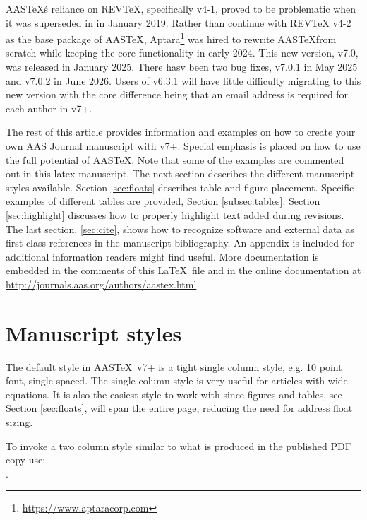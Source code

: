 \documentclass[linenumbers,amsmath,trackchanges]{aastex702}
\newcommand\aastex{AAS\TeX}
\newcommand\latex{La\TeX}
\begin{document}
\aastex\'s reliance on REVTeX, specifically v4-1, proved to be problematic when it was superseded in in January 2019. Rather than continue with REVTeX v4-2 as the base package of \aastex, Aptara\footnote{\url{https://www.aptaracorp.com}} was hired to rewrite \aastex from scratch while keeping the core functionality in early 2024. This new version, v7.0, was released in January 2025. There hasv been two bug fixes, v7.0.1 in May 2025 and v7.0.2 in June 2026. Users of v6.3.1 will have little difficulty migrating to this new version with the core difference being that an email address is required for each author in v7+.

The rest of this article provides information and examples on how to create
your own AAS Journal manuscript with v7+.  Special emphasis is placed on
how to use the full potential of \aastex. Note that some of the examples are commented out in this latex manuscript. The next section describes
the different manuscript styles available.
Section \ref{sec:floats} describes table and figure placement. 
Specific examples of different tables are provided,  Section
\ref{subsec:tables}.
Section \ref{sec:highlight}
discusses how to properly highlight text added during revisions.  
The last section,
\ref{sec:cite}, shows how to recognize software and external data as first
class references in the manuscript bibliography.  An appendix is included
for additional information readers might find useful.
More documentation is embedded in the comments of this \latex\ file and in the online documentation at
\url{http://journals.aas.org/authors/aastex.html}.

\section{Manuscript styles} \label{sec:style}

The default style in \aastex\ v7+ is a tight single column style, e.g. 10
point font, single spaced.  The single column style is very useful for
articles with wide equations. It is also the easiest style to work with
since figures and tables, see Section \ref{sec:floats}, will span the
entire page, reducing the need for address float sizing.

To invoke a two column style similar to what is produced in
the published PDF copy use: \\

. \\
\end{document}
